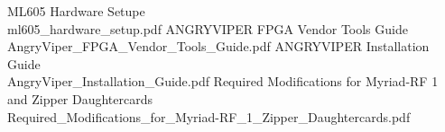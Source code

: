 \documentclass{article}
\begin{document}
\pagebreak
  \begin{thebibliography}{1}


   ML605 Hardware Setupe\\
	 ml605\_hardware\_setup.pdf
   ANGRYVIPER FPGA Vendor Tools Guide\\
	 AngryViper\_FPGA\_Vendor\_Tools\_Guide.pdf
	    ANGRYVIPER Installation Guide\\
	 AngryViper\_Installation\_Guide.pdf
	    Required Modifications for Myriad-RF 1 and Zipper Daughtercards\\
	 Required\_Modifications\_for\_Myriad-RF\_1\_Zipper\_Daughtercards.pdf

  \end{thebibliography}
\end{document}
